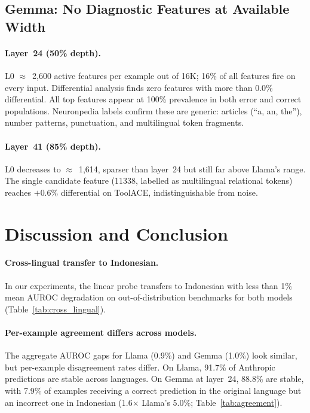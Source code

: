 \documentclass{article}
\newcommand{\auroc}{AUROC\xspace}
\begin{document}
\subsection{Gemma: No Diagnostic Features at Available Width}

\paragraph{Layer~24 (50\% depth).}
L0 $\approx$~2,600 active features per example out of 16K; 16\% of all
features fire on every input.
Differential analysis finds zero features with more than 0.0\% differential.
All top features appear at 100\% prevalence in both error and correct
populations.
Neuronpedia labels confirm these are generic: articles (``a, an, the''),
number patterns, punctuation, and multilingual token fragments.

\paragraph{Layer~41 (85\% depth).}
L0 decreases to $\approx$~1,614, sparser than layer~24 but still far above
Llama's range.
The single candidate feature (11338, labelled as multilingual relational
tokens) reaches $+0.6\%$ differential on ToolACE, indistinguishable from noise.


\section{Discussion and Conclusion}
\label{sec:discussion}

\paragraph{Cross-lingual transfer to Indonesian.}
In our experiments, the linear probe transfers to Indonesian with less
than 1\% mean \auroc degradation on out-of-distribution benchmarks for
both models (Table~\ref{tab:cross_lingual}).

\paragraph{Per-example agreement differs across models.}
The aggregate \auroc gaps for Llama (0.9\%) and Gemma (1.0\%) look similar,
but per-example disagreement rates differ.
On Llama, 91.7\% of Anthropic predictions are stable across languages.
On Gemma at layer~24, 88.8\% are stable, with 7.9\% of examples receiving a
correct prediction in the original language but an incorrect one in
Indonesian (1.6$\times$ Llama's 5.0\%; Table~\ref{tab:agreement}).
\end{document}
